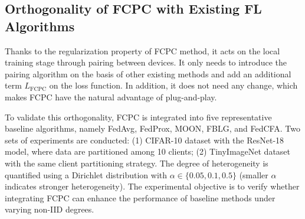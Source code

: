 \documentclass[journal,twoside,web]{ieeecolor}
\begin{document}
\begin{table}[htbp]
\caption{Performance Comparison Under Different Levels of Dual-Skewed Non-IID Data on CIFAR-10 and CIFAR-100}
\label{tab:dual}
\centering
\scriptsize  %
{}
\end{table}



\subsection{ Orthogonality of FCPC with Existing FL Algorithms}

Thanks to the regularization property of FCPC method, it acts on the local training stage through pairing between devices. It only needs to introduce the pairing algorithm on the basis of other existing methods and add an additional term $L_{\text{FCPC}}$ on the loss function. In addition, it does not need any change, which makes FCPC have the natural advantage of plug-and-play.

To validate this orthogonality, FCPC is integrated into five representative baseline algorithms, namely FedAvg\cite{fedavg}, FedProx\cite{fedprox}, MOON\cite{moon}, FBLG\cite{fblg}, and FedCFA\cite{fedcfa}. Two sets of experiments are conducted: (1) CIFAR-10 dataset with the ResNet-18 model, where data are partitioned among 10 clients;  (2) TinyImageNet dataset with the same client partitioning strategy. The degree of heterogeneity is quantified using a Dirichlet distribution with \( \alpha \in \{0.05, 0.1, 0.5\} \) (smaller \( \alpha \) indicates stronger heterogeneity). The experimental objective is to verify whether integrating FCPC can enhance the performance of baseline methods under varying non-IID degrees.
\end{document}
